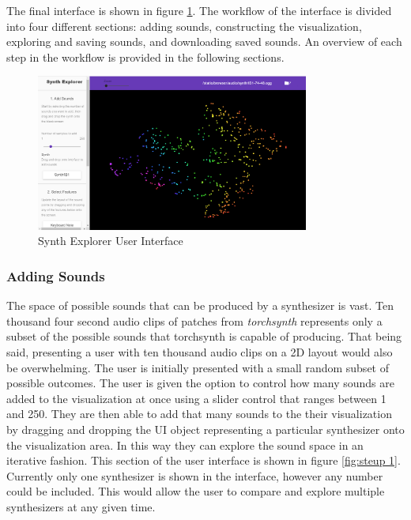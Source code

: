 The final interface is shown in figure \ref{fig:ui_1}. %
The workflow of the interface is divided into four different sections: adding sounds, constructing the visualization, exploring and saving sounds, and downloading saved sounds. An overview of each step in the workflow is provided in the following sections.
\vspace{1cm}
\begin{figure}[ht]
    \centering
    \includegraphics[width=0.8\textwidth]{SynthExplore Init.png}
    \caption{Synth Explorer User Interface}
    \label{fig:ui_1}
\end{figure}

\subsubsection{Adding Sounds}
The space of possible sounds that can be produced by a synthesizer is vast. Ten thousand four second audio clips of patches from \textit{torchsynth} represents only a subset of the possible sounds that torchsynth is capable of producing. That being said, presenting a user with ten thousand audio clips on a 2D layout would also be overwhelming. The user is initially presented with a small random subset of possible outcomes. The user is given the option to control how many sounds are added to the visualization at once using a slider control that ranges between 1 and 250. They are then able to add that many sounds to the their visualization by dragging and dropping the UI object representing a particular synthesizer onto the visualization area. In this way they can explore the sound space in an iterative fashion. This section of the user interface is shown in figure \ref{fig:steup 1}. Currently only one synthesizer is shown in the interface, however any number could be included. This would allow the user to compare and explore multiple synthesizers at any given time. 

